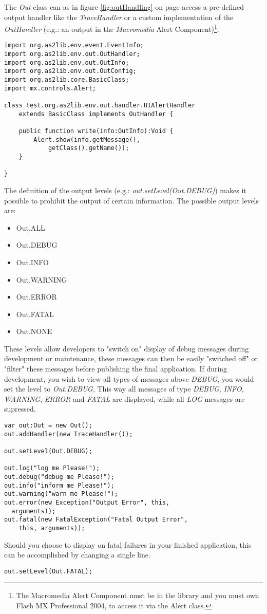 The \emph{Out} class can as in figure \ref{fig:outHandling} on page \pageref{fig:outHandling} access a pre-defined output handler like the \emph{TraceHandler} or a custom implementation of the \emph{OutHandler} (e.g.: an output in the {\sl Macromedia} Alert Component)\footnote{The Macromedia Alert Component must be in the library and you must own Flash MX Professional 2004, to access it via the Alert class.}:

\begin{lstlisting}[frame=single]
import org.as2lib.env.event.EventInfo;
import org.as2lib.env.out.OutHandler;
import org.as2lib.env.out.OutInfo;
import org.as2lib.env.out.OutConfig;
import org.as2lib.core.BasicClass;
import mx.controls.Alert;

class test.org.as2lib.env.out.handler.UIAlertHandler 
	extends BasicClass implements OutHandler {

	public function write(info:OutInfo):Void {
		Alert.show(info.getMessage(), 
			getClass().getName());
	}

}
\end{lstlisting}

The definition of the output levels (e.g.: \emph{out.setLevel(Out.DEBUG)}) makes it possible to prohibit the output of certain information.
The possible output levels are:
\begin{itemize}
	\item Out.ALL
	\item Out.DEBUG
	\item Out.INFO
	\item Out.WARNING
	\item Out.ERROR
	\item Out.FATAL
	\item Out.NONE
\end{itemize}

These levels allow developers to "switch on" display of debug messages during development or maintenance, these messages can then be easily "switched off" or "filter" these messages before publishing the final application. If during development, you wish to view all types of messages above \textit{DEBUG}, you would set the level to \emph{Out.DEBUG}, This way all messages of type \textit{DEBUG}, \textit{INFO}, \textit{WARNING}, \textit{ERROR} and \textit{FATAL} are displayed, while all \textit{LOG} messages are supressed. 

\begin{lstlisting}[frame=single]
var out:Out = new Out();
out.addHandler(new TraceHandler());

out.setLevel(Out.DEBUG);

out.log("log me Please!");
out.debug("debug me Please!");
out.info("inform me Please!");
out.warning("warn me Please!");
out.error(new Exception("Output Error", this, 
  arguments));
out.fatal(new FatalException("Fatal Output Error",
	this, arguments));
\end{lstlisting}

Should you choose to display on fatal failures in your finished application, this can be accomplished by changing a single line.

\begin{lstlisting}[frame=single]
out.setLevel(Out.FATAL);
\end{lstlisting}
